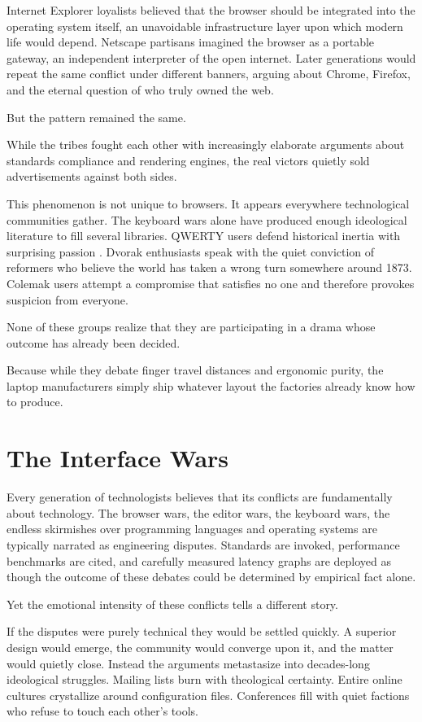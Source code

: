 \documentclass[12pt]{article}
\theoremstyle{definition}
\begin{document}
Internet Explorer loyalists believed that the browser should be
integrated into the operating system itself, an unavoidable
infrastructure layer upon which modern life would depend. Netscape
partisans imagined the browser as a portable gateway, an independent
interpreter of the open internet. Later generations would repeat the
same conflict under different banners, arguing about Chrome, Firefox,
and the eternal question of who truly owned the web.

But the pattern remained the same.

While the tribes fought each other with increasingly elaborate arguments
about standards compliance and rendering engines, the real victors
quietly sold advertisements against both sides.

This phenomenon is not unique to browsers. It appears everywhere
technological communities gather. The keyboard wars alone have produced
enough ideological literature to fill several libraries. QWERTY users
defend historical inertia with surprising passion \cite{yamada1980}.
Dvorak enthusiasts speak with the quiet conviction of reformers who
believe the world has taken a wrong turn somewhere around 1873. Colemak
users attempt a compromise that satisfies no one and therefore provokes
suspicion from everyone.

None of these groups realize that they are participating in a drama whose
outcome has already been decided.

Because while they debate finger travel distances and ergonomic purity,
the laptop manufacturers simply ship whatever layout the factories
already know how to produce.

\section{The Interface Wars}

Every generation of technologists believes that its conflicts are
fundamentally about technology. The browser wars, the editor wars, the
keyboard wars, the endless skirmishes over programming languages and
operating systems are typically narrated as engineering disputes.
Standards are invoked, performance benchmarks are cited, and carefully
measured latency graphs are deployed as though the outcome of these
debates could be determined by empirical fact alone.

Yet the emotional intensity of these conflicts tells a different story.

If the disputes were purely technical they would be settled quickly. A
superior design would emerge, the community would converge upon it, and
the matter would quietly close. Instead the arguments metastasize into
decades-long ideological struggles. Mailing lists burn with theological
certainty. Entire online cultures crystallize around configuration files.
Conferences fill with quiet factions who refuse to touch each other's
tools.
\end{document}
